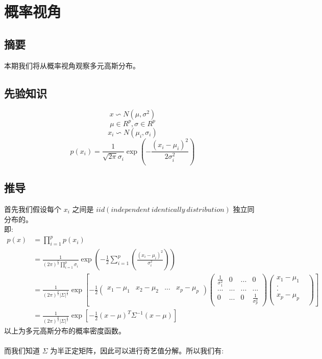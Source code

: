 \documentclass{report}
\begin{document}
\chapter{概率视角}
\section{摘要}
本期我们将从概率视角观察多元高斯分布。
\section{先验知识}
$$
x \backsim N(\mu, \sigma^2)
$$
$$
\mu \in R^p, \sigma \in R^p
$$
$$
x_i \backsim N(\mu_i, \sigma_i)
$$
$$
p(x_i) = \frac{1}{\sqrt{2\pi}\sigma_i} \exp(-\frac{(x_i - \mu_i)^2}{2\sigma_i^2})
$$
\section{推导}
首先我们假设每个 $x_i$ 之间是 $iid (independent\ identically\ distribution)$ 独立同分布的。\\
即:
$$
\begin{aligned}
p(x)
&=\prod_{i=1}^p p(x_i)\\
&=\frac{1}{(2\pi)^{\frac{p}{2}}\prod_{i=1}^p \sigma_i} \exp(-\frac{1}{2}\sum_{i=1}^p (\frac{(x_i-\mu_i)^2}{\sigma_i^2}))\\
&=\frac{1}{(2\pi)^{\frac{p}{2}}|\Sigma|^{\frac{1}{2}}} \exp[-\frac{1}{2}
\left (
\begin{matrix}
x_1-\mu_1 & x_2-\mu_2 & ... & x_p - \mu_p
\end{matrix}
\right )
\left (
\begin{matrix}
\frac{1}{\sigma_1^2} & 0 & ... & 0 \\
... & ... & ... & ... \\
0 & ... & 0 & \frac{1}{\sigma_p^2}
\end{matrix}
\right )
\left (
\begin{matrix}
x_1-\mu_1\\
.&\\
.&\\
x_p-\mu_p\\
\end{matrix}
\right )]\\
&=\frac{1}{(2\pi)^{\frac{p}{2}}|\Sigma|^{\frac{1}{2}}} \exp[-\frac{1}{2}(x-\mu)^T \Sigma^{-1}(x-\mu)]
\end{aligned}
$$
以上为多元高斯分布的概率密度函数。\\\\
而我们知道 $\Sigma$ 为半正定矩阵，因此可以进行奇艺值分解。所以我们有:
\end{document}
